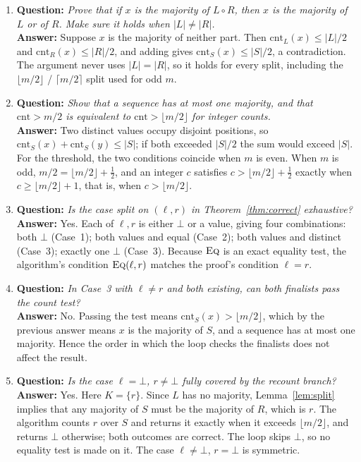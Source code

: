\documentclass[conference]{IEEEtran}
\newcommand{\Eq}{\textsc{Eq}}
\newcommand{\cnt}{\mathrm{cnt}}
\begin{document}
\begin{enumerate}
\item \textbf{Question:} \emph{Prove that if $x$ is the majority of
$L \circ R$, then $x$ is the majority of $L$ or of $R$. Make sure it holds
when $|L| \ne |R|$.}\\
\textbf{Answer:} Suppose $x$ is the majority of neither part. Then
$\cnt_L(x) \le |L|/2$ and $\cnt_R(x) \le |R|/2$, and adding gives
$\cnt_S(x) \le |S|/2$, a contradiction. The argument never uses $|L| = |R|$,
so it holds for every split, including the $\lfloor m/2 \rfloor$ /
$\lceil m/2 \rceil$ split used for odd $m$.

\item \textbf{Question:} \emph{Show that a sequence has at most one majority,
and that $\cnt > m/2$ is equivalent to $\cnt > \lfloor m/2 \rfloor$ for
integer counts.}\\
\textbf{Answer:} Two distinct values occupy disjoint positions, so
$\cnt_S(x) + \cnt_S(y) \le |S|$; if both exceeded $|S|/2$ the sum would exceed
$|S|$. For the threshold, the two conditions coincide when $m$ is even. When
$m$ is odd, $m/2 = \lfloor m/2 \rfloor + \tfrac12$, and an integer $c$
satisfies $c > \lfloor m/2 \rfloor + \tfrac12$ exactly when
$c \ge \lfloor m/2 \rfloor + 1$, that is, when $c > \lfloor m/2 \rfloor$.

\item \textbf{Question:} \emph{Is the case split on $(\ell, r)$ in
Theorem~\ref{thm:correct} exhaustive?}\\
\textbf{Answer:} Yes. Each of $\ell, r$ is either $\bot$ or a value, giving
four combinations: both $\bot$ (Case~1); both values and equal (Case~2); both
values and distinct (Case~3); exactly one $\bot$ (Case~3). Because $\Eq$ is an
exact equality test, the algorithm's condition $\Eq(\ell, r)$ matches the
proof's condition $\ell = r$.

\item \textbf{Question:} \emph{In Case~3 with $\ell \ne r$ and both existing,
can both finalists pass the count test?}\\
\textbf{Answer:} No. Passing the test means $\cnt_S(x) > \lfloor m/2 \rfloor$,
which by the previous answer means $x$ is the majority of $S$, and a sequence
has at most one majority. Hence the order in which the loop checks the
finalists does not affect the result.

\item \textbf{Question:} \emph{Is the case $\ell = \bot$, $r \ne \bot$ fully
covered by the recount branch?}\\
\textbf{Answer:} Yes. Here $K = \{r\}$. Since $L$ has no majority,
Lemma~\ref{lem:split} implies that any majority of $S$ must be the majority
of $R$, which is $r$. The algorithm counts $r$ over $S$ and returns it exactly
when it exceeds $\lfloor m/2 \rfloor$, and returns $\bot$ otherwise; both
outcomes are correct. The loop skips $\bot$, so no equality test is made on
it. The case $\ell \ne \bot$, $r = \bot$ is symmetric.


\end{enumerate}
\end{document}
